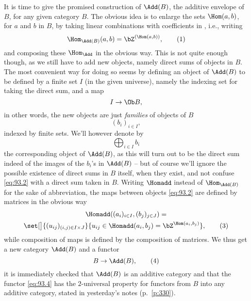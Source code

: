 \label{sec:93}%
It is time to give the promised construction of $\Add(B)$, the
additive envelope of $B$, for any given category $B$. The obvious idea
is to enlarge the sets $\Hom(a,b)$, for $a$ and $b$ in $B$, by taking
linear combinations with coefficients in \bZ, i.e., writing
\begin{equation}
  \label{eq:93.1}
  \Hom_{\Add(B)}(a,b) = \bZ^{(\Hom(a,b))},\tag{1}
\end{equation}
and composing these $\Hom_{\Add}$ in the obvious way. This is not
quite enough though, as we still have to add new objects, namely
direct sums of objects in $B$. The most convenient way for doing so
seems by defining an object of $\Add(B)$ to be defined by a finite set
$I$ (in the given universe), namely the indexing set for taking the
direct sum, and a map
\[ I\to\Ob B,\]
in other words, the new objects are just \emph{families} of objects of
$B$
\[(b_i)_{i\in I},\]
indexed by finite sets. We'll however denote by
\begin{equation}
  \label{eq:93.2}
  \bigoplus_{i\in I}b_i\tag{2}
\end{equation}
the corresponding object of $\Add(B)$, as this will turn out to be the
direct sum indeed of the images of the $b_i$'s in $\Add(B)$ -- but of
course we'll ignore the possible existence of direct sums in $B$
itself, when they exist, and not confuse \eqref{eq:93.2} with a direct
sum taken in $B$. Writing $\Homadd$ instead of $\Hom_{\Add(B)}$ for
the sake of abbreviation, the maps between objects \eqref{eq:93.2} are
defined by matrices in the obvious way
\begin{multline}
  \label{eq:93.3}
  \Homadd((a_i)_{i\in I},(b_j)_{j\in J}) = \\
  \set[\big]{(u_{ij})_{(i,j)\in I\times
      J}}{u_{ij}\in\Homadd(a_i,b_j)=\bZ^{\Hom(a_i,b_j)}},\tag{3}
\end{multline}
while composition of maps is defined by the composition of
matrices. We thus get a new category $\Add(B)$ and a functor
\begin{equation}
  \label{eq:93.4}
  B\to\Add(B),\tag{4}
\end{equation}
it is immediately checked that $\Add(B)$ is an additive
category and that the functor \eqref{eq:93.4} has the $2$-universal
property for functors from $B$ into any additive category, stated in
yesterday's notes (p.\ \ref{p:330}).

